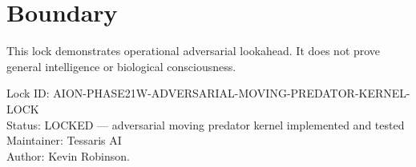 \documentclass[11pt,a4paper]{article}
\begin{document}
\section{Boundary}

This lock demonstrates operational adversarial lookahead. It does not prove general intelligence or biological consciousness.

\bigskip

\noindent
Lock ID: AION-PHASE21W-ADVERSARIAL-MOVING-PREDATOR-KERNEL-LOCK\\
Status: LOCKED --- adversarial moving predator kernel implemented and tested\\
Maintainer: Tessaris AI\\
Author: Kevin Robinson.
\end{document}
